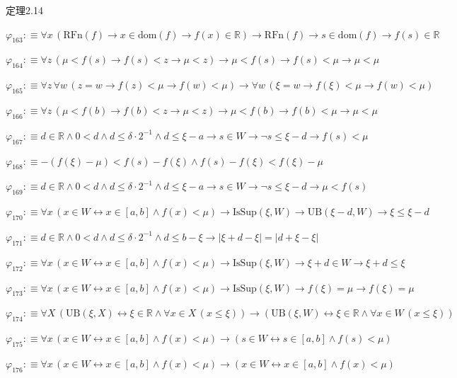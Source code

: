 \begin{fullproof}{定理2.14}
\begin{abbrevlist}
\item $\varphi_{163} :\equiv \forall x\,(\mathrm{RFn}(f) \to x \in \mathrm{dom}(f) \to f(x) \in \mathbb{R}) \to \mathrm{RFn}(f) \to s \in \mathrm{dom}(f) \to f(s) \in \mathbb{R}$
\item $\varphi_{164} :\equiv \forall z\,(\mu < f(s) \to f(s) < z \to \mu < z) \to \mu < f(s) \to f(s) < \mu \to \mu < \mu$
\item $\varphi_{165} :\equiv \forall z\,\forall w\,(z = w \to f(z) < \mu \to f(w) < \mu) \to \forall w\,(\xi = w \to f(\xi) < \mu \to f(w) < \mu)$
\item $\varphi_{166} :\equiv \forall z\,(\mu < f(b) \to f(b) < z \to \mu < z) \to \mu < f(b) \to f(b) < \mu \to \mu < \mu$
\item $\varphi_{167} :\equiv d \in \mathbb{R} \land 0 < d \land d \leq \delta \cdot 2^{-1} \land d \leq \xi - a \to s \in W \to \neg s \leq \xi - d \to f(s) < \mu$
\item $\varphi_{168} :\equiv -(f(\xi) - \mu) < f(s) - f(\xi) \land f(s) - f(\xi) < f(\xi) - \mu$
\item $\varphi_{169} :\equiv d \in \mathbb{R} \land 0 < d \land d \leq \delta \cdot 2^{-1} \land d \leq \xi - a \to s \in W \to \neg s \leq \xi - d \to \mu < f(s)$
\item $\varphi_{170} :\equiv \forall x\,(x \in W \leftrightarrow x \in [a,b] \land f(x) < \mu) \to \mathrm{IsSup}(\xi,W) \to \mathrm{UB}(\xi - d,W) \to \xi \leq \xi - d$
\item $\varphi_{171} :\equiv d \in \mathbb{R} \land 0 < d \land d \leq \delta \cdot 2^{-1} \land d \leq b - \xi \to \lvert \xi + d - \xi \rvert = \lvert d + \xi - \xi \rvert$
\item $\varphi_{172} :\equiv \forall x\,(x \in W \leftrightarrow x \in [a,b] \land f(x) < \mu) \to \mathrm{IsSup}(\xi,W) \to \xi + d \in W \to \xi + d \leq \xi$
\item $\varphi_{173} :\equiv \forall x\,(x \in W \leftrightarrow x \in [a,b] \land f(x) < \mu) \to \mathrm{IsSup}(\xi,W) \to f(\xi) = \mu \to f(\xi) = \mu$
\item $\varphi_{174} :\equiv \forall X\,(\mathrm{UB}(\xi,X) \leftrightarrow \xi \in \mathbb{R} \land \forall x \in X\,(x \leq \xi)) \to (\mathrm{UB}(\xi,W) \leftrightarrow \xi \in \mathbb{R} \land \forall x \in W\,(x \leq \xi))$
\item $\varphi_{175} :\equiv \forall x\,(x \in W \leftrightarrow x \in [a,b] \land f(x) < \mu) \to (s \in W \leftrightarrow s \in [a,b] \land f(s) < \mu)$
\item $\varphi_{176} :\equiv \forall x\,(x \in W \leftrightarrow x \in [a,b] \land f(x) < \mu) \to (x \in W \leftrightarrow x \in [a,b] \land f(x) < \mu)$

\end{abbrevlist}
\end{fullproof}
